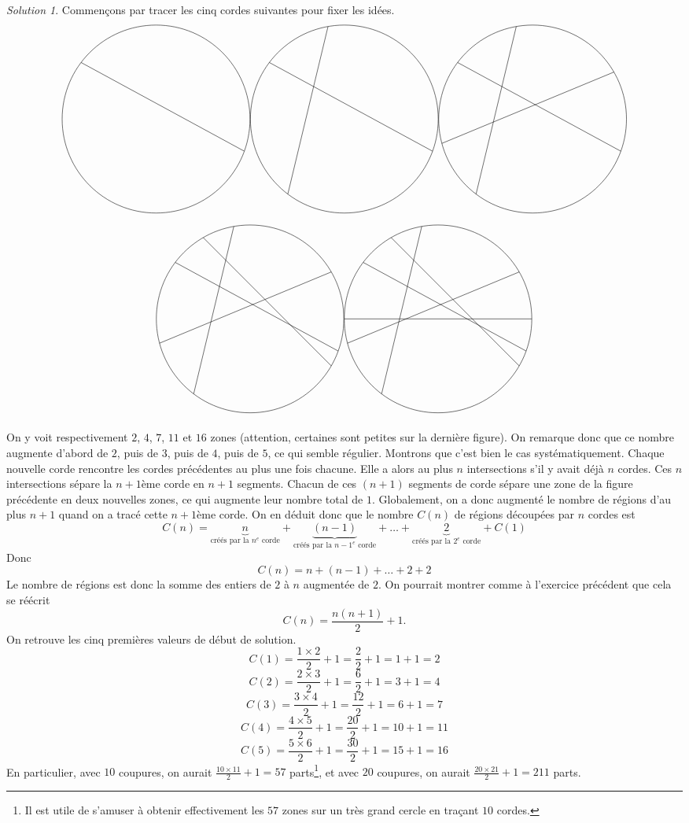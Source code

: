 \documentclass[14pt]{article}
\theoremstyle{remark}
\newtheorem*{sol}{Solution}
\newcounter{n}
\theoremstyle{plain}
\begin{document}
 \begin{sol}
 Commençons par tracer les cinq cordes suivantes pour fixer les idées.
\[ \begin{tikzpicture}
 \draw (0,0) circle (3);
 \draw (340:3) -- (143:3);
 \end{tikzpicture}
 \begin{tikzpicture}
 \draw (0,0) circle (3);
 \draw (340:3) -- (143:3);
 \draw (100:3) -- (233:3);
 \end{tikzpicture}
 \begin{tikzpicture}
 \draw (0,0) circle (3);
 \draw (340:3) -- (143:3);
 \draw (100:3) -- (233:3);
 \draw(195:3)--(30:3);
 \end{tikzpicture}\]
 \[\begin{tikzpicture}
 \draw (0,0) circle (3);
 \draw (340:3) -- (143:3);
 \draw (100:3) -- (233:3);
 \draw(195:3)--(30:3);
 \draw(330:3)--(120:3);
 \end{tikzpicture}
 \begin{tikzpicture}
 \draw (0,0) circle (3);
 \draw (340:3) -- (143:3);
 \draw (100:3) -- (233:3);
 \draw(195:3)--(30:3);
 \draw(330:3)--(120:3);
 \draw(180:3)--(0:3);
 \end{tikzpicture}\]
 \end{sol}
On y voit respectivement $2$, $4$, $7$, $11$ et $16$ zones (attention, certaines sont petites sur la dernière figure). On remarque donc que ce nombre augmente d'abord de $2$, puis de $3$, puis de $4$, puis de $5$, ce qui semble régulier. Montrons que c'est bien le cas systématiquement. 
 Chaque nouvelle corde rencontre les cordes précédentes au plus une fois chacune. Elle a alors au plus $n$ intersections s'il y avait déjà $n$ cordes. Ces $n$ intersections sépare la $n+1$ème corde en $n+1$ segments. Chacun de ces $(n+1)$ segments de corde sépare une zone de la figure précédente en deux nouvelles zones, ce qui augmente leur nombre total de $1$. Globalement, on a donc augmenté le nombre de régions d'au plus $n+1$ quand on a tracé cette $n+1$ème corde. 
 On en déduit donc que le nombre $C(n)$ de régions découpées par $n$ cordes est 
 \[C(n) = \underbrace{n}_{\text{créés par la $n^e$ corde}} + \underbrace{(n-1)}_{\text{créés par la $n-1^e$ corde}} + \ldots +\underbrace{2}_{\text{créés par la $2^e$ corde}} + C(1)\]
 Donc \[C(n) = n+ (n-1) + \ldots + 2 + 2\]
 Le nombre de régions est donc la somme des entiers de $2$ à $n$ augmentée de $2$. 
 On pourrait montrer comme à l'exercice précédent que cela se réécrit \[C(n) = \frac{n(n+1)}2+1.\]
 On retrouve les cinq premières valeurs de début de solution.
 \[C(1) = \frac{1\times2}2+1= \frac22+1 = 1+1=2\]
 \[C(2) = \frac{2\times3}2+1= \frac62+1 = 3+1=4\]
 \[C(3) = \frac{3\times4}2+1= \frac{12}2+1 = 6+1=7\]
 \[C(4) = \frac{4\times5}2+1= \frac{20}2+1 = 10+1=11\]
 \[C(5) = \frac{5\times6}2+1= \frac{30}2+1 = 15+1=16\]
 En particulier, avec $10$ coupures, on aurait $\frac{10\times11}2+1= 57$ parts\footnote{Il est utile de s'amuser à obtenir effectivement les $57$ zones sur un très grand cercle en traçant $10$ cordes.}, et avec $20$ coupures, on aurait $\frac{20\times21}2+1= 211$ parts. 
 
\end{document}
